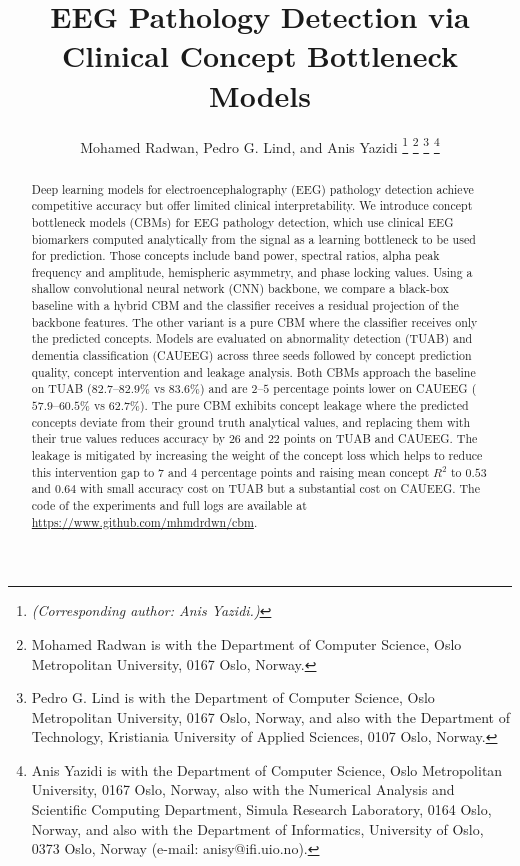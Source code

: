 \documentclass[journal,twoside,web]{ieeecolor}
\begin{document}
\title{EEG Pathology Detection via Clinical Concept
       Bottleneck Models}
\author{Mohamed Radwan, Pedro G. Lind, and Anis Yazidi
\thanks{\textit{(Corresponding author: Anis Yazidi.)}}
\thanks{Mohamed Radwan is with the Department of Computer Science, Oslo
Metropolitan University, 0167 Oslo, Norway.}
\thanks{Pedro G. Lind is with the Department of Computer Science, Oslo
Metropolitan University, 0167 Oslo, Norway, and also with the Department of
Technology, Kristiania University of Applied Sciences, 0107 Oslo, Norway.}
\thanks{Anis Yazidi is with the Department of Computer Science, Oslo
Metropolitan University, 0167 Oslo, Norway, also with the Numerical Analysis
and Scientific Computing Department, Simula Research Laboratory, 0164 Oslo,
Norway, and also with the Department of Informatics, University of Oslo,
0373 Oslo, Norway (e-mail: anisy@ifi.uio.no).}}

\maketitle

\begin{abstract}
Deep learning models for electroencephalography (EEG) pathology detection achieve competitive accuracy but offer limited clinical interpretability. We introduce concept bottleneck models (CBMs) for EEG pathology detection, which
use clinical EEG biomarkers computed analytically from the signal as a learning bottleneck to be used for prediction. Those concepts include band power, spectral ratios, alpha peak frequency and amplitude, hemispheric asymmetry, and phase locking values. Using a shallow convolutional neural network (CNN) backbone, we compare a black-box baseline with a hybrid CBM and the classifier receives a residual projection of the backbone features. The other variant is a pure CBM where the classifier receives only the predicted concepts. Models are evaluated on abnormality detection (TUAB) and dementia classification (CAUEEG)
across three seeds followed by concept prediction quality, concept intervention and leakage analysis. Both CBMs approach the baseline on TUAB ($82.7$--$82.9\%$ vs $83.6\%$) and are $2$--$5$ percentage points lower on CAUEEG ($57.9$--$60.5\%$ vs $62.7\%$). The pure CBM exhibits concept leakage where the predicted concepts deviate from their ground truth analytical values, and replacing them with their true values reduces accuracy by $26$ and
$22$ points on TUAB and CAUEEG. The leakage is mitigated by increasing the weight of the concept loss which helps to reduce this intervention gap to
$7$ and $4$ percentage points and raising mean concept $R^2$ to $0.53$ and $0.64$ with small accuracy cost on TUAB but a substantial cost on CAUEEG. The code of the experiments and full logs  are available at
\href{https://www.github.com/mhmdrdwn/cbm}{https://www.github.com/mhmdrdwn/cbm}.
\end{abstract}
\end{document}
